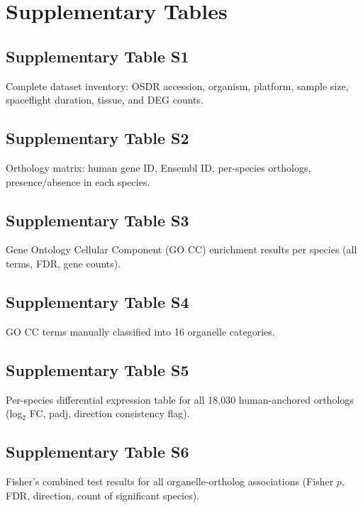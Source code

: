 \documentclass[11pt,a4paper]{article}
\begin{document}
\section{Supplementary Tables}
\label{sec:supp:tables}

\subsection*{Supplementary Table S1}
\label{sec:supp:table_s1}

Complete dataset inventory: OSDR accession, organism, platform, sample size, 
spaceflight duration, tissue, and DEG counts.

\subsection*{Supplementary Table S2}
\label{sec:supp:table_s2}

Orthology matrix: human gene ID, Ensembl ID, per-species orthologs, presence/absence 
in each species.

\subsection*{Supplementary Table S3}
\label{sec:supp:table_s3}

Gene Ontology Cellular Component (GO CC) enrichment results per species (all terms, 
FDR, gene counts).

\subsection*{Supplementary Table S4}
\label{sec:supp:table_s4}

GO CC terms manually classified into 16 organelle categories.

\subsection*{Supplementary Table S5}
\label{sec:supp:table_s5}

Per-species differential expression table for all 18,030 human-anchored orthologs 
(log$_2$ FC, padj, direction consistency flag).

\subsection*{Supplementary Table S6}
\label{sec:supp:table_s6}

Fisher's combined test results for all organelle-ortholog associations (Fisher $p$, 
FDR, direction, count of significant species).
\end{document}
